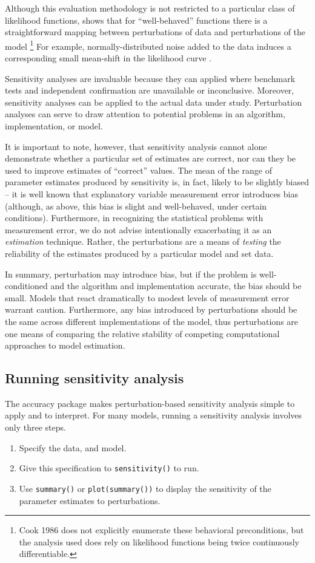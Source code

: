 \documentclass[11pt]{article}
\let\code=\texttt
\newcommand{\pkg}[1]{{\normalfont\fontseries{b}\selectfont #1}}
\begin{document}
Although this evaluation methodology is not restricted to a particular class of likelihood functions,
\citet{Cook86} shows that for ``well-behaved'' functions there is a straightforward mapping between 
perturbations of data and perturbations of the model 
	\footnote{Cook 1986 does not explicitly enumerate these behavioral preconditions, 
	but the analysis used does rely on likelihood functions being twice continuously differentiable.} 
For example, normally-distributed noise added to the data induces a corresponding small mean-shift in 
the likelihood curve \citep{StlCoo93}.

Sensitivity analyses are invaluable because they can applied where benchmark tests and independent 
confirmation are unavailable or inconclusive. Moreover, sensitivity analyses can be applied to the 
actual data under study. Perturbation analyses can serve to draw attention to potential problems 
in an algorithm, implementation, or model.

It is important to note, however, that sensitivity analysis cannot alone demonstrate whether a 
particular set of estimates are correct, nor can they be used to improve estimates of 
``correct'' values. The mean of the range of parameter estimates produced by sensitivity is, in 
fact, likely to be slightly biased -- it is well known that explanatory variable measurement error 
introduces bias (although, as above, this bias is slight and well-behaved, under certain conditions). 
Furthermore, in recognizing the statistical problems with measurement error, we do not advise 
intentionally exacerbating it as an \emph{estimation} technique. Rather, the perturbations are a means of \emph{testing} the 
reliability of the estimates produced by a particular model and set data. 

In summary, perturbation may introduce bias, but if the problem is well-conditioned and the 
algorithm and implementation accurate, the bias should be small. Models that react dramatically to modest levels of measurement error warrant caution. Furthermore, any bias introduced by perturbations should be the same across different implementations of the model, thus perturbations are one means of comparing the relative stability of competing computational approaches to model estimation. 

\subsection{Running sensitivity analysis}
The \pkg{accuracy} package makes perturbation-based sensitivity
 analysis simple to apply and to interpret. For many models, running
 a sensitivity analysis involves only three steps.                             
\begin{enumerate}
\item Specify the data, and model.  
\item Give this specification to \code{sensitivity()} to run.
\item Use \code{summary()} or \code{plot(summary())} to display the sensitivity of the parameter estimates to perturbations.
\end{enumerate}
\end{document}
